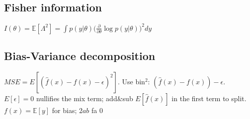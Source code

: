 \subsection*{Fisher information}
$I(\theta) \mathrm{=} \mathbb{E}[\Lambda^2]\mathrm{=}\int p(y|\theta)\big( \frac{\partial}{\partial\theta}\log p(y|\theta)\big)^2dy $

\subsection*{Bias-Variance decomposition}
$MSE = E[(\hat{f}(x) - f(x) - \epsilon)^2]$.  Use bin$^2$: $(\hat{f}(x) - f(x)) - \epsilon$. $E[\epsilon] = 0$ nullifies the mix term; add\&sub $E[\hat{f}(x)]$ in the first term to split. $f(x)\mathrm{=}\mathbb{E}[y]$ for bias; $2ab$ fa 0